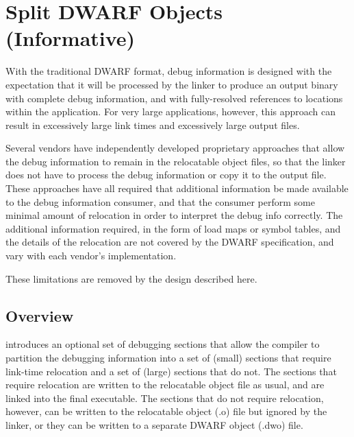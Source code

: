 \chapter[Split DWARF Objects (Informative)]{Split DWARF Objects (Informative)}
\label{app:splitdwarfobjectsinformative}
With the traditional DWARF format, debug information is designed
with the expectation that it will be processed by the linker to
produce an output binary with complete debug information, and
with fully-resolved references to locations within the
application. For very large applications, however, this approach
can result in excessively large link times and excessively large
output files. 

Several vendors have independently developed
proprietary approaches that allow the debug information to remain
in the relocatable object files, so that the linker does not have
to process the debug information or copy it to the output file.
These approaches have all required that additional information be
made available to the debug information consumer, and that the
consumer perform some minimal amount of relocation in order to
interpret the debug info correctly. The additional information
required, in the form of load maps or symbol tables, and the
details of the relocation are not covered by the DWARF
specification, and vary with each vendor's implementation.

These limitations are removed by the design described here.

\section{Overview}
\label{app:splitoverview}
\DWARFVersionV{} introduces an optional set of debugging sections
that allow the compiler to partition the debugging information
into a set of (small) sections that require link-time relocation
and a set of (large) sections that do not. The sections that
require relocation are written to the relocatable object file as
usual, and are linked into the final executable. The sections
that do not require relocation, however, can be written to the
relocatable object (.o) file but ignored by the linker, or they
can be written to a separate DWARF object (.dwo{}) 
 file.

